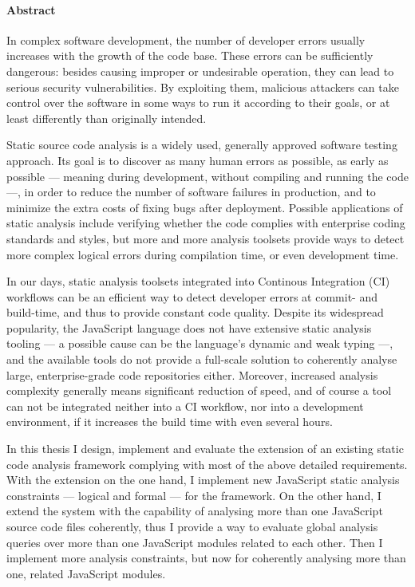 \clearpage

\paragraph*{Abstract}
{}
\thispagestyle{plain}

In complex software development, the number of developer errors usually increases with the growth of the code base. These errors can be sufficiently dangerous: besides causing improper or undesirable operation, they can lead to serious security vulnerabilities. By exploiting them, malicious attackers can take control over the software in some ways to run it according to their goals, or at least differently than originally intended.

Static source code analysis is a widely used, generally approved software testing approach. Its goal is to discover as many human errors as possible, as early as possible — meaning during development, without compiling and running the code —, in order to reduce the number of software failures in production, and to minimize the extra costs of fixing bugs after deployment. Possible applications of static analysis include verifying whether the code complies with enterprise coding standards and styles, but more and more analysis toolsets provide ways to detect more complex logical errors during compilation time, or even development time.

In our days, static analysis toolsets integrated into Continous Integration (CI) workflows can be an efficient way to detect developer errors at commit- and build-time, and thus to provide constant code quality. Despite its widespread popularity, the JavaScript language does not have extensive static analysis tooling — a possible cause can be the language's dynamic and weak typing —, and the available tools do not provide a full-scale solution to coherently analyse large, enterprise-grade code repositories either. Moreover, increased analysis complexity generally means significant reduction of speed, and of course a tool can not be integrated neither into a CI workflow, nor into a development environment, if it increases the build time with even several hours.

In this thesis I design, implement and evaluate the extension of an existing static code analysis framework complying with most of the above detailed requirements. With the extension on the one hand, I implement new JavaScript static analysis constraints — logical and formal — for the framework. On the other hand, I extend the system with the capability of analysing more than one JavaScript source code files coherently, thus I provide a way to evaluate global analysis queries over more than one JavaScript modules related to each other. Then I implement more analysis constraints, but now for coherently analysing more than one, related JavaScript modules.


